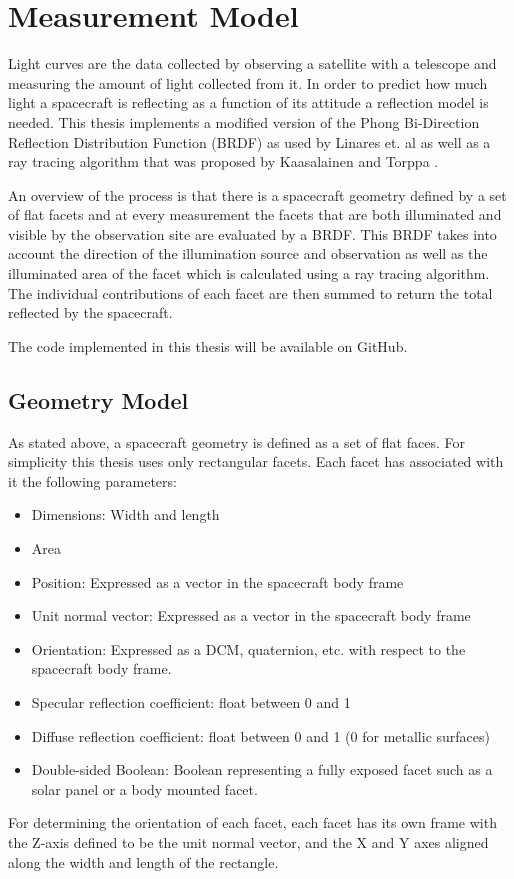 \chapter*{Measurement Model}


Light curves are the data collected by observing a satellite with a telescope and measuring the amount of light collected from it. In order to predict how much light a spacecraft is reflecting as a function of its attitude a reflection model is needed. This thesis implements a modified version of the Phong Bi-Direction Reflection Distribution Function (BRDF) as used by Linares et. al \cite{Linares_data_fusion} as well as a ray tracing algorithm that was proposed by Kaasalainen and Torppa \cite{kaasalainen_LCI}.

An overview of the process is that there is a spacecraft geometry defined by a set of flat facets and at every measurement the facets that are both illuminated and visible by the observation site are evaluated by a BRDF. This BRDF takes into account the direction of the illumination source and observation as well as the illuminated area of the facet which is calculated using a ray tracing algorithm. The individual contributions of each facet are then summed to return the total reflected by the spacecraft.

The code implemented in this thesis will be available on GitHub.

\section*{Geometry Model}

As stated above, a spacecraft geometry is defined as a set of flat faces. For simplicity this thesis uses only rectangular facets. Each facet has associated with it the following parameters:
\begin{itemize}
	\setlength\itemsep{0em}
	\item Dimensions: Width and length
	\item Area
	\item Position: Expressed as a vector in the spacecraft body frame
	\item Unit normal vector: Expressed as a vector in the spacecraft body frame
	\item Orientation: Expressed as a DCM, quaternion, etc. with respect to the spacecraft body frame.
	\item Specular reflection coefficient: float between 0 and 1
	\item Diffuse reflection coefficient: float between 0 and 1 (0 for metallic surfaces)
	\item Double-sided Boolean: Boolean representing a fully exposed facet such as a solar panel or a body mounted facet.
\end{itemize}
For determining the orientation of each facet, each facet has its own frame with the Z-axis defined to be the unit normal vector, and the X and Y axes aligned along the width and length of the rectangle.

